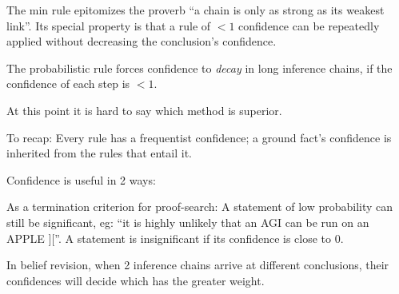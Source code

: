 \documentclass[a4paper]{report}
\begin{document}
%

The min rule epitomizes the proverb ``a chain is only as strong as its weakest link''.  Its special property is that a rule of $< 1$ confidence can be repeatedly applied without decreasing the conclusion's confidence.

The probabilistic rule forces confidence to \textit{decay} in long inference chains, if the confidence of each step is $< 1$.

At this point it is hard to say which method is superior.

To recap:  Every rule has a frequentist confidence;  a ground fact's confidence is inherited from the rules that entail it.

Confidence is useful in 2 ways:
\begin{compactenum}[1.]
\item  As a termination criterion for proof-search:  A statement of low probability can still be significant, eg: ``it is highly unlikely that an AGI can be run on an APPLE $][$''.  A statement is insignificant if its confidence is close to 0.
\item  In belief revision, when 2 inference chains arrive at different conclusions, their confidences will decide which has the greater weight.
\end{compactenum}
\end{document}
